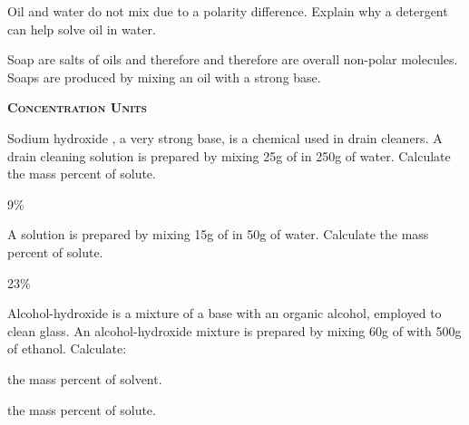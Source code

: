 \documentclass[main.tex]{subfiles}
\begin{document}
\begin{multicols*}{2}
\begin{question}[ID=\the\value{numA}]
Oil and water do not mix due to a polarity difference. Explain why a detergent can help solve oil in water.
\end{question}
\begin{solution}
 Soap are salts of oils and therefore and therefore are overall non-polar molecules. Soaps are produced by mixing an oil with a strong base.
 \hspace{0.1cm}\end{solution}
{\raggedright\textsc{\textbf{Concentration Units }}\par}

\begin{question}[ID=\the\value{numA}]
Sodium hydroxide , a very strong base, is a chemical used in drain cleaners. A drain cleaning solution is prepared by mixing 25g of  in 250g of water. Calculate the mass percent of solute.
\end{question}
\begin{solution}
9\%
 \hspace{0.1cm}\end{solution}
\begin{question}[ID=\the\value{numA}]
A solution is prepared by mixing 15g of  in 50g of water. Calculate the mass percent of solute.
\end{question}
\begin{solution}
23\%
 \hspace{0.1cm}\end{solution}
\begin{question}[ID=\the\value{numA}]
Alcohol-hydroxide is a mixture of a base with an organic alcohol, employed to clean glass. An alcohol-hydroxide mixture is prepared by mixing 60g of  with 500g of ethanol. Calculate:
\begin{inparaenum}[(a)]
 \item the mass percent of solvent. %
  \item the mass percent of solute.%
 \end{inparaenum} 
\end{question}

\end{multicols*}
\end{document}

